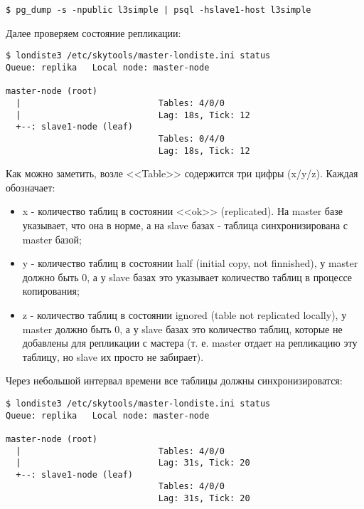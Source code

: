\begin{lstlisting}[label=lst:londiste-replica-dump1,caption=Клонирование структуры базы]
$ pg_dump -s -npublic l3simple | psql -hslave1-host l3simple
\end{lstlisting}

Далее проверяем состояние репликации:

\begin{lstlisting}[label=lst:londiste-replica15,caption=Статус кластера]
$ londiste3 /etc/skytools/master-londiste.ini status
Queue: replika   Local node: master-node

master-node (root)
  |                           Tables: 4/0/0
  |                           Lag: 18s, Tick: 12
  +--: slave1-node (leaf)
                              Tables: 0/4/0
                              Lag: 18s, Tick: 12
\end{lstlisting}

Как можно заметить, возле <<Table>> содержится три цифры (x/y/z). Каждая обозначает:

\begin{itemize}
  \item x - количество таблиц в состоянии <<ok>> (replicated). На master базе указывает, что она в норме, а на slave базах - таблица синхронизирована с master базой;
  \item y - количество таблиц в состоянии half (initial copy, not finnished), у master должно быть 0, а у slave базах это указывает количество таблиц в процессе копирования;
  \item z - количество таблиц в состоянии ignored (table not replicated locally), у master должно быть 0, а у slave базах это количество таблиц, которые не добавлены для репликации с мастера (т. е. master отдает на репликацию эту таблицу, но slave их просто не забирает).
\end{itemize}

Через небольшой интервал времени все таблицы должны синхронизироватся:

\begin{lstlisting}[label=lst:londiste-replica16,caption=Статус кластера]
$ londiste3 /etc/skytools/master-londiste.ini status
Queue: replika   Local node: master-node

master-node (root)
  |                           Tables: 4/0/0
  |                           Lag: 31s, Tick: 20
  +--: slave1-node (leaf)
                              Tables: 4/0/0
                              Lag: 31s, Tick: 20
\end{lstlisting}


